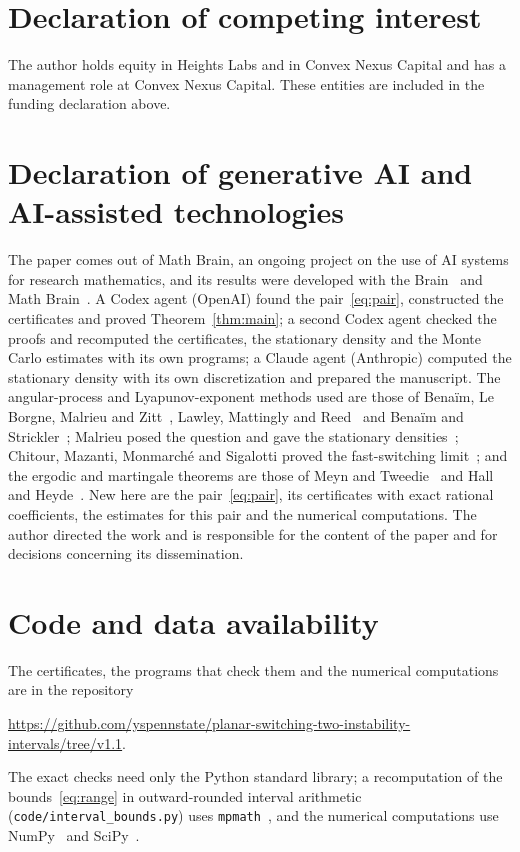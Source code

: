 \documentclass[11pt]{amsart}
\newcommand{\file}[1]{\nolinkurl{#1}}
\begin{document}
\section*{Declaration of competing interest}
The author holds equity in Heights Labs and in Convex Nexus Capital and has a management role at Convex Nexus Capital.
These entities are included in the funding declaration above.

\section*{Declaration of generative AI and AI-assisted technologies}
The paper comes out of Math Brain, an ongoing project on the use of AI systems for research mathematics, and its
results were developed with the Brain~\cite{BrainFramework} and Math Brain~\cite{MathBrainRepo}. A Codex agent
(OpenAI) found the pair~\eqref{eq:pair}, constructed the certificates and proved Theorem~\ref{thm:main}; a second
Codex agent checked the proofs and recomputed the certificates, the stationary density and the Monte Carlo estimates
with its own programs; a Claude agent (Anthropic) computed the stationary density with its own discretization and prepared the
manuscript. The angular-process and Lyapunov-exponent methods used are those of Bena\"im, Le Borgne, Malrieu and
Zitt~\cite{BLMZ14}, Lawley, Mattingly and Reed~\cite{LMR14} and Bena\"im and Strickler~\cite{BS19}; Malrieu posed the
question and gave the stationary densities~\cite{Mal15}; Chitour, Mazanti, Monmarch\'e and Sigalotti proved the
fast-switching limit~\cite{CMMS23}; and the ergodic and martingale theorems are those of Meyn and Tweedie~\cite{MT09}
and Hall and Heyde~\cite{HH80}. New here are the pair~\eqref{eq:pair}, its certificates with exact rational
coefficients, the estimates for this pair and the numerical computations. The author directed the work and is responsible for the content of the paper and for decisions
concerning its dissemination.

\section*{Code and data availability}
The certificates, the programs that check them and the numerical computations are in the repository
\begin{center}\url{https://github.com/yspennstate/planar-switching-two-instability-intervals/tree/v1.1}.\end{center}
The exact checks need only the Python
standard library; a recomputation of the bounds~\eqref{eq:range} in outward-rounded interval arithmetic
(\file{code/interval_bounds.py}) uses \texttt{mpmath}~\cite{mpmath}, and the numerical computations use
NumPy~\cite{NumPy} and SciPy~\cite{SciPy}.
\end{document}
